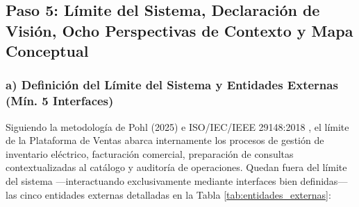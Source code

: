 	\subsection{Paso 5: Límite del Sistema, Declaración de Visión, Ocho Perspectivas de Contexto y Mapa Conceptual}
\subsubsection{a) Definición del Límite del Sistema y Entidades Externas (Mín. 5 Interfaces)}
Siguiendo la metodología de Pohl (2025) \cite{pohl2025} e ISO/IEC/IEEE 29148:2018 \cite{ieee29148}, el límite de la Plataforma de Ventas abarca internamente los procesos de gestión de inventario eléctrico, facturación comercial, preparación de consultas contextualizadas al catálogo y auditoría de operaciones. Quedan fuera del límite del sistema —interactuando exclusivamente mediante interfaces bien definidas— las cinco entidades externas detalladas en la Tabla \ref{tab:entidades_externas}:
